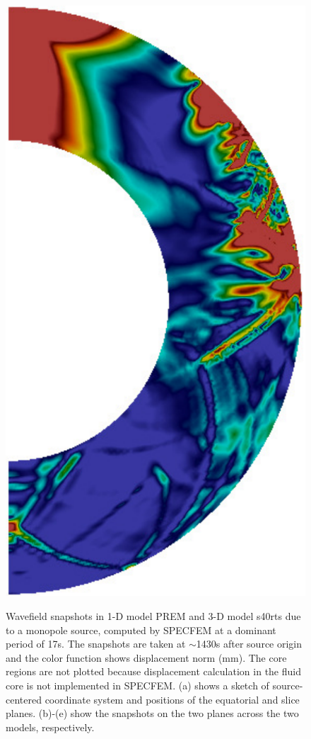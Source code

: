 \documentclass[extra]{gji}
\begin{document}
\begin{figure}
\begin{minipage}{0.6\textwidth}
\begin{minipage}{.39\textwidth}
      \includegraphics[height=1.275\textwidth]{fig/snapshot/3d-slice.pdf}
      \label{fig:3dsl}    
    \end{minipage}
  \end{minipage}%
  \caption{Wavefield snapshots in 1-D model 
  PREM and 3-D model s40rts due to a monopole source, 
  computed by SPECFEM at a dominant period of 17s. 
  The snapshots are taken at $\sim$1430s after source origin 
  and the color function shows displacement norm (mm). 
  The core regions are not plotted because displacement calculation
  in the fluid core is not implemented in SPECFEM. 
  (a) shows a sketch of source-centered coordinate system and 
  positions of the equatorial and slice planes. 
  (b)-(e) show the snapshots on the two planes across the two models, respectively.}
  \label{fig:snapshot}
\end{figure}
\end{document}
